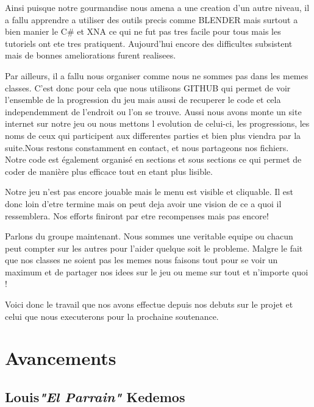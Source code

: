 \documentclass{article}
\begin{document}
\par
Ainsi puisque notre gourmandise nous amena a une creation d'un autre niveau, il a fallu apprendre a utiliser des outils precis comme BLENDER mais surtout a bien manier le C\# et XNA ce qui ne fut pas tres facile pour tous mais les tutoriels ont ete tres pratiquent. Aujourd'hui encore des difficultes subsistent mais de bonnes ameliorations furent realisees.
\newline

\par
Par ailleurs, il a fallu nous organiser comme nous ne sommes pas dans les memes classes. C'est donc pour cela que nous utilisons GITHUB qui permet de voir l'ensemble de la progression du jeu mais aussi de recuperer le code et cela independemment de l'endroit ou l'on se trouve. Aussi nous avons monte un site internet sur notre jeu ou nous mettons l evolution de celui-ci, les progressions, les noms de ceux qui participent aux differentes parties et bien plus viendra par la suite.Nous restons constamment en contact, et nous partageons nos fichiers. Notre code est également organisé en sections et sous sections ce qui permet de coder de manière plus efficace tout en etant  plus lisible.
\newline

\par
Notre jeu n'est pas encore jouable mais le menu est visible et cliquable. Il est donc loin d'etre termine mais on peut deja avoir une vision de ce a quoi il ressemblera. Nos efforts finiront par etre recompenses mais pas encore!
\newline

\par
Parlons du groupe maintenant. Nous sommes une veritable equipe ou chacun peut compter sur les autres pour l'aider quelque soit le probleme. Malgre le fait que nos classes ne soient pas les memes nous faisons tout pour se voir un maximum et de partager nos idees sur le jeu ou meme sur tout et n'importe quoi !
\newline

\par
Voici donc le travail que nos avons effectue depuis nos debuts sur le projet et celui que nous executerons pour la prochaine soutenance.

\newpage

\section{Avancements}
\subsection{Louis\textcolor{pseudoblue}{\textit{"El Parrain"}} Kedemos }
\end{document}
